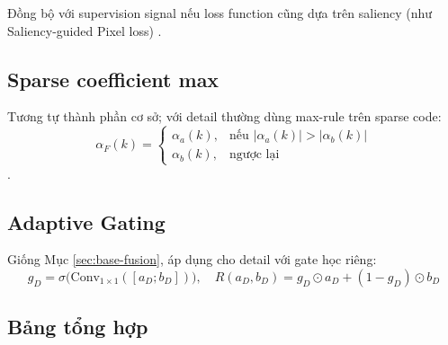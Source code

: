 \documentclass[12pt,a4paper]{article}
\begin{document}
Đồng bộ với supervision signal nếu loss function cũng dựa trên saliency (như Saliency-guided Pixel loss) \cite{liu2016saliency}.

\subsection{Sparse coefficient max}

Tương tự thành phần cơ sở; với detail thường dùng max-rule trên sparse code:
\begin{equation}
\alpha_F(k) = \begin{cases} \alpha_a(k), & \text{nếu } |\alpha_a(k)| > |\alpha_b(k)| \\ \alpha_b(k), & \text{ngược lại} \end{cases}
\end{equation}
\cite{yang2010spfusion}.

\subsection{Adaptive Gating}

Giống Mục \ref{sec:base-fusion}, áp dụng cho detail với gate học riêng:
\begin{equation}
g_D = \sigma\big(\mathrm{Conv}_{1\times 1}([a_D; b_D])\big), \quad R(a_D, b_D) = g_D \odot a_D + (1 - g_D) \odot b_D
\end{equation}

\subsection{Bảng tổng hợp}
\end{document}
